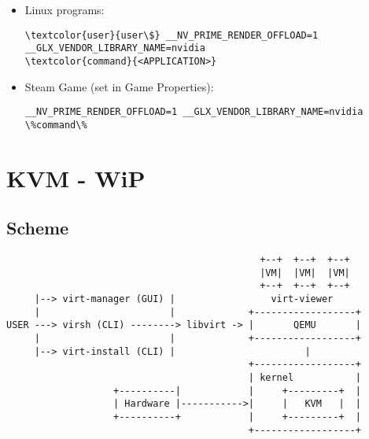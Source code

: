 \documentclass[10pt, a4paper, onecolumn, openany]{book} %
\begin{document}
\begin{enumerate}
\begin{itemize}
    \item Linux programs:
\begin{Verbatim}[commandchars=\\\{\}]
\textcolor{user}{user\$} __NV_PRIME_RENDER_OFFLOAD=1 __GLX_VENDOR_LIBRARY_NAME=nvidia 
\textcolor{command}{<APPLICATION>}
\end{Verbatim}
    \item Steam Game (set in Game Properties):
\begin{Verbatim}[commandchars=\\\{\}]
__NV_PRIME_RENDER_OFFLOAD=1 __GLX_VENDOR_LIBRARY_NAME=nvidia \%command\%
\end{Verbatim}
\end{itemize}
\end{enumerate}
\chapter{KVM - WiP}
\section{Scheme}
\begin{verbatim}
                                             +--+  +--+  +--+
                                             |VM|  |VM|  |VM|
                                             +--+  +--+  +--+
     |--> virt-manager (GUI) |                 virt-viewer
     |                       |             +------------------+
USER ---> virsh (CLI) --------> libvirt -> |       QEMU       |
     |                       |             +------------------+
     |--> virt-install (CLI) |                       |
                                           +------------------+
                                           | kernel           |
                   +----------|            |     +---------+  |
                   | Hardware |----------->|     |   KVM   |  |
                   +----------+            |     +---------+  |
                                           +------------------+
\end{verbatim}
\end{document}

